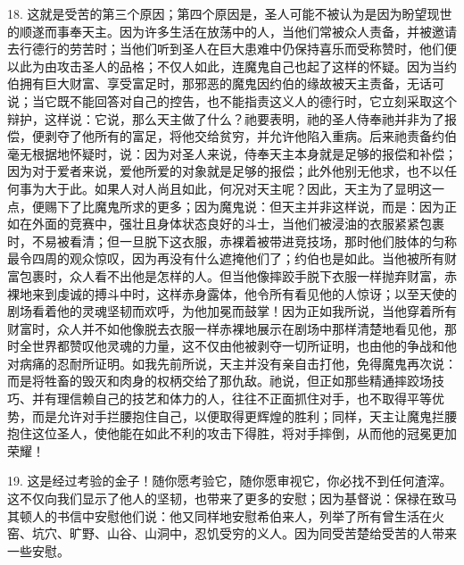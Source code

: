 18. 这就是受苦的第三个原因；第四个原因是，圣人可能不被认为是因为盼望现世的顺遂而事奉天主。因为许多生活在放荡中的人，当他们常被众人责备，并被邀请去行德行的劳苦时；当他们听到圣人在巨大患难中仍保持喜乐而受称赞时，他们便以此为由攻击圣人的品格；不仅人如此，连魔鬼自己也起了这样的怀疑。因为当约伯拥有巨大财富、享受富足时，那邪恶的魔鬼因约伯的缘故被天主责备，无话可说；当它既不能回答对自己的控告，也不能指责这义人的德行时，它立刻采取这个辩护，这样说：它说，那么天主做了什么？祂要表明，祂的圣人侍奉祂并非为了报偿，便剥夺了他所有的富足，将他交给贫穷，并允许他陷入重病。后来祂责备约伯毫无根据地怀疑时，说：因为对圣人来说，侍奉天主本身就是足够的报偿和补偿；因为对于爱者来说，爱他所爱的对象就是足够的报偿；此外他别无他求，也不以任何事为大于此。如果人对人尚且如此，何况对天主呢？因此，天主为了显明这一点，便赐下了比魔鬼所求的更多；因为魔鬼说：但天主并非这样说，而是：因为正如在外面的竞赛中，强壮且身体状态良好的斗士，当他们被浸油的衣服紧紧包裹时，不易被看清；但一旦脱下这衣服，赤裸着被带进竞技场，那时他们肢体的匀称最令四周的观众惊叹，因为再没有什么遮掩他们了；约伯也是如此。当他被所有财富包裹时，众人看不出他是怎样的人。但当他像摔跤手脱下衣服一样抛弃财富，赤裸地来到虔诚的搏斗中时，这样赤身露体，他令所有看见他的人惊讶；以至天使的剧场看着他的灵魂坚韧而欢呼，为他加冕而鼓掌！因为正如我所说，当他穿着所有财富时，众人并不如他像脱去衣服一样赤裸地展示在剧场中那样清楚地看见他，那时全世界都赞叹他灵魂的力量，这不仅由他被剥夺一切所证明，也由他的争战和他对病痛的忍耐所证明。如我先前所说，天主并没有亲自击打他，免得魔鬼再次说：而是将牲畜的毁灭和肉身的权柄交给了那仇敌。祂说，但正如那些精通摔跤场技巧、并有理信赖自己的技艺和体力的人，往往不正面抓住对手，也不取得平等优势，而是允许对手拦腰抱住自己，以便取得更辉煌的胜利；同样，天主让魔鬼拦腰抱住这位圣人，使他能在如此不利的攻击下得胜，将对手摔倒，从而他的冠冕更加荣耀！\par

19. 这是经过考验的金子！随你愿考验它，随你愿审视它，你必找不到任何渣滓。这不仅向我们显示了他人的坚韧，也带来了更多的安慰；因为基督说：保禄在致马其顿人的书信中安慰他们说：他又同样地安慰希伯来人，列举了所有曾生活在火窑、坑穴、旷野、山谷、山洞中，忍饥受穷的义人。因为同受苦楚给受苦的人带来一些安慰。\par

